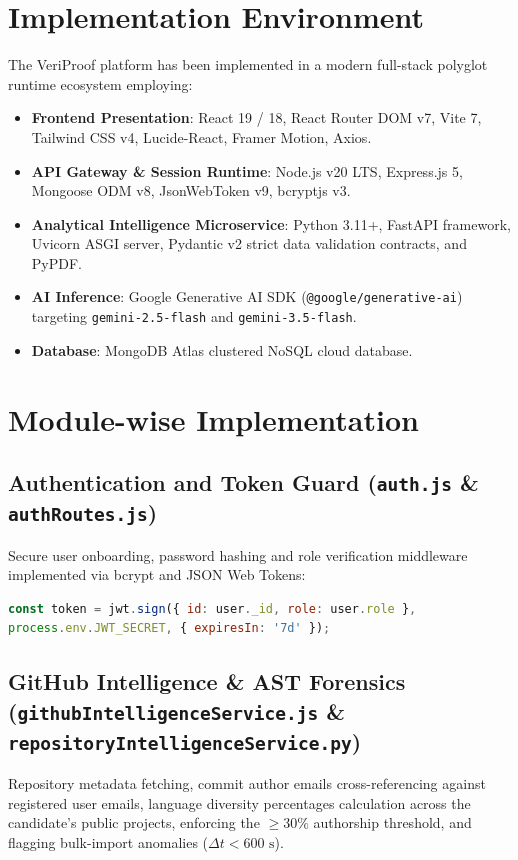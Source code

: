 \section{Implementation Environment}
The VeriProof platform has been implemented in a modern full-stack polyglot runtime ecosystem employing:
\begin{itemize}
    \item \textbf{Frontend Presentation}: React 19 / 18, React Router DOM v7, Vite 7, Tailwind CSS v4, Lucide-React, Framer Motion, Axios.
    \item \textbf{API Gateway \& Session Runtime}: Node.js v20 LTS, Express.js 5, Mongoose ODM v8, JsonWebToken v9, bcryptjs v3.
    \item \textbf{Analytical Intelligence Microservice}: Python 3.11+, FastAPI framework, Uvicorn ASGI server, Pydantic v2 strict data validation contracts, and PyPDF.
    \item \textbf{AI Inference}: Google Generative AI SDK (\texttt{@google/generative-ai}) targeting \texttt{gemini-2.5-flash} and \texttt{gemini-3.5-flash}.
    \item \textbf{Database}: MongoDB Atlas clustered NoSQL cloud database.
\end{itemize}

\section{Module-wise Implementation}
\subsection{Authentication and Token Guard (\texttt{auth.js} \& \texttt{authRoutes.js})}
Secure user onboarding, password hashing and role verification middleware implemented via bcrypt and JSON Web Tokens:
\begin{lstlisting}[language=JavaScript]
const token = jwt.sign({ id: user._id, role: user.role },
process.env.JWT_SECRET, { expiresIn: '7d' });
\end{lstlisting}

\subsection{GitHub Intelligence \& AST Forensics (\texttt{githubIntelligenceService.js} \& \texttt{repositoryIntelligenceService.py})}
Repository metadata fetching, commit author emails cross-referencing against registered user emails, language diversity percentages calculation across the candidate's public projects, enforcing the $\ge 30\%$ authorship threshold, and flagging bulk-import anomalies ($\Delta t < 600\text{ s}$).

